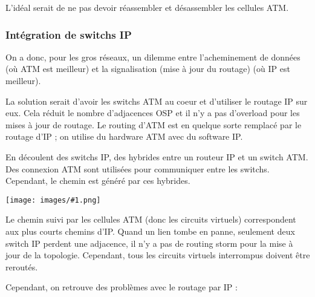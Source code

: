 \documentclass[10pt,a4paper]{report}
\newcommand{\dessin}[1]{\begin{center}\texttt{[image: images/\#1.png]}\end{center}}
\begin{document}
			L'idéal serait de ne pas devoir réassembler et désassembler les cellules ATM.
	
			\subsubsection{Intégration de switchs IP}
						
			On a donc, pour les gros réseaux, un dilemme entre l'acheminement de données (où ATM est meilleur) et la signalisation (mise à jour du routage) (où IP est meilleur).

			La solution serait d'avoir les switchs ATM au coeur et d'utiliser le routage IP sur eux. Cela réduit le nombre d'adjacences OSP et il n'y a pas d'overload pour les mises à jour de routage. Le routing d'ATM est en quelque sorte remplacé par le routage d'IP ; on utilise du hardware ATM avec du software IP.
						
		
			En découlent des switchs IP, des hybrides entre un routeur IP et un switch ATM. Des connexion ATM sont utilisées pour communiquer entre les switchs. Cependant, le chemin est généré par ces hybrides.
			
			\dessin{16}
			
			Le chemin suivi par les cellules ATM (donc les circuits virtuels) correspondent aux plus courts chemins d'IP.
			Quand un lien tombe en panne, seulement deux switch IP perdent une adjacence, il n'y a pas de routing storm pour la mise à jour de la topologie. Cependant, tous les circuits virtuels interrompus doivent être reroutés.
	
			Cependant, on retrouve des problèmes avec le routage par IP :
	
\end{document}
